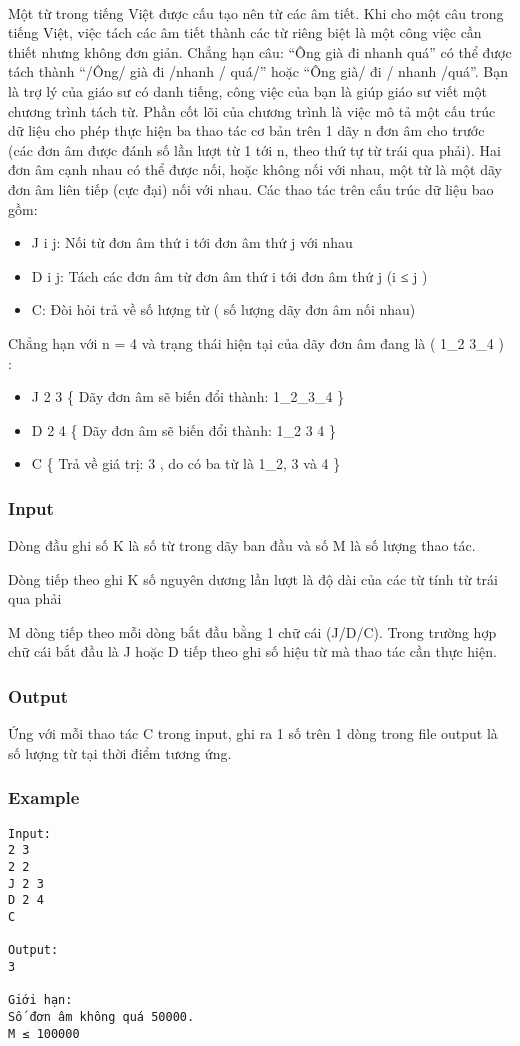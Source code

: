 

 

Một từ trong tiếng Việt được cấu tạo nên từ các âm tiết. Khi cho một câu trong tiếng Việt, việc tách các âm tiết thành các từ riêng biệt là một công việc cần thiết nhưng không đơn giản. Chẳng hạn câu: “Ông già đi nhanh quá” có thể được tách thành “/Ông/ già đi /nhanh / quá/” hoặc “Ông già/ đi / nhanh /quá”. Bạn là trợ lý của giáo sư có danh tiếng, công việc của bạn là giúp giáo sư viết một chương trình tách từ. Phần cốt lõi của chương trình là việc mô tả một cấu trúc dữ liệu cho phép thực hiện ba thao tác cơ bản trên 1 dãy n đơn âm cho trước (các đơn âm được đánh số lần lượt từ 1 tới n, theo thứ tự từ trái qua phải). Hai đơn âm cạnh nhau có thể được nối, hoặc không nối với nhau, một từ là một dãy đơn âm liên tiếp (cực đại) nối với nhau. Các thao tác trên cấu trúc dữ liệu bao gồm:
\begin{itemize}
	\item J i j: Nối từ đơn âm thứ i tới đơn âm thứ j với nhau
	\item D i j: Tách các đơn âm từ đơn âm thứ i tới đơn âm thứ j (i ≤ j )
	\item C: Đòi hỏi trả về số lượng từ ( số lượng dãy đơn âm nối nhau)
\end{itemize}

Chẳng hạn với n = 4 và trạng thái hiện tại của dãy đơn âm đang là ( 1\_2 3\_4 ) :
\begin{itemize}
	\item J 2 3 \{ Dãy đơn âm sẽ biến đổi thành: 1\_2\_3\_4 \}
	\item D 2 4 \{ Dãy đơn âm sẽ biến đổi thành: 1\_2 3 4 \}
	\item C \{ Trả về giá trị: 3 , do có ba từ là 1\_2, 3 và 4 \}
\end{itemize}

\subsubsection{Input}

Dòng đầu ghi số K là số từ trong dãy ban đầu và số M là số lượng thao tác.

Dòng tiếp theo ghi K số nguyên dương lần lượt là độ dài của các từ tính từ trái qua phải

M dòng tiếp theo mỗi dòng bắt đầu bằng 1 chữ cái (J/D/C). Trong trường hợp chữ cái bắt đầu là J hoặc D tiếp theo ghi số hiệu từ mà thao tác cần thực hiện.

\subsubsection{Output}

Ứng với mỗi thao tác C trong input, ghi ra 1 số trên 1 dòng trong file output là số lượng từ tại thời điểm tương ứng.

\subsubsection{Example}
\begin{verbatim}
Input:
2 3
2 2
J 2 3
D 2 4
C

Output:
3

Giới hạn:
Số đơn âm không quá 50000.
M ≤ 100000
\end{verbatim}